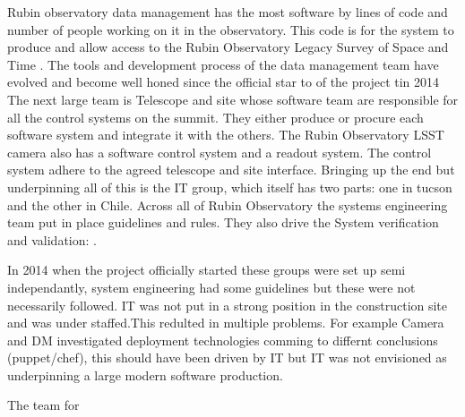 Rubin observatory  data management \citep{2015arXiv151207914J} has the most software by lines of code and number of people working on it in the observatory. This code is for the system to produce and allow access to the Rubin Observatory Legacy Survey of Space and Time \cite{LSE-163}.
The tools and development process of the data management team have evolved and become well honed since the official star to of the project tin 2014 \citep{2018SPIE10707E..09J}
The next large team is  Telescope and site  \citep{2014SPIE.9145E..1AG} whose software team are responsible for all the control systems on the summit. They either produce or procure each software system and integrate it with the others.
The Rubin Observatory LSST camera \citep{2010SPIE.7735E..0JK} also has a software control system and a readout system. The control system adhere to the agreed telescope and site interface.
 Bringing up the end but underpinning all of this is the IT group, which itself has two parts: one in tucson and the other in Chile.
 Across all of Rubin Observatory the systems engineering team \citep{2014SPIE.9150E..0MC} put in place guidelines and rules. They also drive the  System verification and validation: \citep{2014SPIE.9150E..0NS}.

In 2014 when the project officially started these groups were set up semi independantly, system engineering had some guidelines but these were not necessarily followed. IT was not put in a strong position in the construction site and was under staffed.This redulted in multiple problems. For example Camera and DM investigated deployment technologies comming to differnt conclusions (puppet/chef), this should have been driven by IT but IT was not envisioned as underpinning a large  modern software production.

The team for

